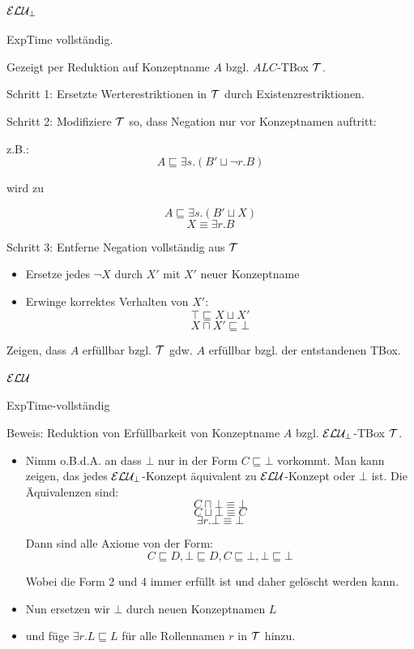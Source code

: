 \paragraph{$\mathcal{E}\mathcal{L}\mathcal{U}_{\bot}$}

ExpTime vollständig.

Gezeigt per Reduktion auf Konzeptname $A$ bzgl. $ALC$-TBox $\mathcal{T}$.

Schritt 1: Ersetzte Werterestriktionen in $\mathcal{T}$ durch Existenzrestriktionen.

Schritt 2: Modifiziere $\mathcal{T}$ so, dass Negation nur vor Konzeptnamen auftritt:

z.B.: $$A \sqsubseteq \exists s.(B' \sqcup \neg r.B)$$

wird zu

$$A \sqsubseteq \exists s.(B' \sqcup X)$$
$$X \equiv \exists r.B$$

Schritt 3: Entferne Negation vollständig aus $\mathcal{T}$ 

\begin{itemize}
	\item Ersetze jedes $\neg X$ durch $X'$ mit $X'$ neuer Konzeptname
	\item Erwinge korrektes Verhalten von $X'$:
	$$\top \sqsubseteq X \sqcup X'$$
	$$X \sqcap X' \sqsubseteq \bot$$
\end{itemize}

Zeigen, dass $A$ erfüllbar bzgl. $\mathcal{T}$ gdw. $A$ erfüllbar bzgl. der entstandenen TBox.

\paragraph{$\mathcal{E}\mathcal{L}\mathcal{U}$}

ExpTime-vollständig

Beweis: Reduktion von Erfüllbarkeit von Konzeptname $A$ bzgl. $\mathcal{E}\mathcal{L}\mathcal{U}_{\bot}$-TBox $\mathcal{T}$.

\begin{itemize}
\item Nimm o.B.d.A. an dass $\bot$ nur in der Form $C \sqsubseteq \bot$ vorkommt. Man kann zeigen, das jedes $\mathcal{E}\mathcal{L}\mathcal{U}_{\bot}$-Konzept äquivalent zu $\mathcal{E}\mathcal{L}\mathcal{U}$-Konzept oder $\bot$ ist. Die Äquivalenzen sind:
$$C \sqcap \bot \equiv \bot$$
$$C \sqcup \bot \equiv C$$
$$\exists r.\bot \equiv \bot$$

Dann sind alle Axiome von der Form:
$$C\sqsubseteq D, \bot \sqsubseteq D, C \sqsubseteq \bot, \bot \sqsubseteq \bot$$

Wobei die Form 2 und 4 immer erfüllt ist und daher gelöscht werden kann.


\item Nun ersetzen wir $\bot$ durch neuen Konzeptnamen $L$

\item und füge $\exists r.L \sqsubseteq L$ für alle Rollennamen $r$ in $\mathcal{T}$ hinzu.
\end{itemize}

